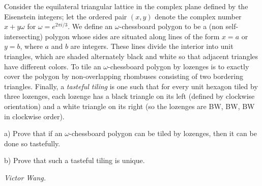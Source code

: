 Consider the equilateral triangular lattice in the complex plane defined by the Eisenstein integers; let the ordered pair $(x,y)$ denote the complex number $x+y\omega$ for $\omega=e^{2\pi i/3}$. We define an $\omega$-chessboard polygon to be a (non self-intersecting) polygon whose sides are situated along lines of the form $x=a$ or $y=b$, where $a$ and $b$ are integers. These lines divide the interior into unit triangles, which are shaded alternately black and white so that adjacent triangles have different colors. To tile an $\omega$-chessboard polygon by lozenges is to exactly cover the polygon by non-overlapping rhombuses consisting of two bordering triangles. Finally, a \textit{tasteful tiling} is one such that for every unit hexagon tiled by three lozenges, each lozenge has a black triangle on its left (defined by clockwise orientation) and a white triangle on its right (so the lozenges are BW, BW, BW in clockwise order).

a) Prove that if an $\omega$-chessboard polygon can be tiled by lozenges, then it can be done so tastefully.

b) Prove that such a tasteful tiling is unique.

\textit{Victor Wang.}